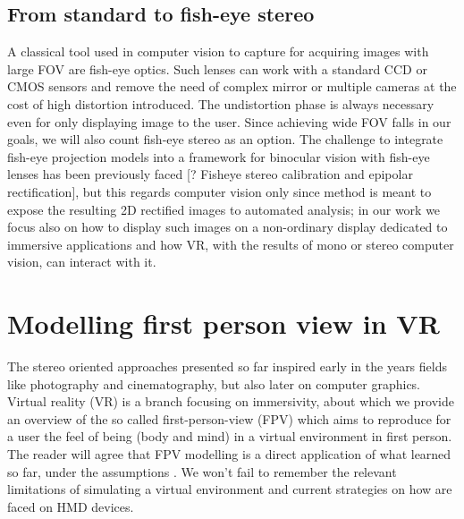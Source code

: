 \subsection{From standard to fish-eye stereo}
A classical tool used in computer vision to capture for acquiring images with large FOV are fish-eye optics. Such lenses can work with a standard CCD or CMOS sensors and remove the need of complex mirror or multiple cameras at the cost of high distortion introduced. The undistortion phase is always necessary even for only displaying image to the user. Since achieving wide FOV falls in our goals, we will also count fish-eye stereo as an option. The challenge to integrate fish-eye projection models into a framework for binocular vision with fish-eye lenses has been previously faced [? Fisheye stereo calibration and epipolar rectification], but this regards computer vision only since method is meant to expose the resulting 2D rectified images to automated analysis; in our work we focus also on how to display such images on a non-ordinary display dedicated to immersive applications and how VR, with the results of mono or stereo computer vision, can interact with it.

\section{Modelling first person view in VR}

The stereo oriented approaches presented so far inspired early in the years fields like photography and cinematography, but also later on computer graphics. Virtual reality (VR) is a branch focusing on immersivity, about which we provide an overview of the so called first-person-view (FPV) which aims to reproduce for a user the feel of being (body and mind) in a virtual environment in first person. The reader will agree that FPV modelling is a direct application of what learned so far, under the assumptions . We won't fail to remember  the relevant limitations of simulating a virtual environment and current strategies on how are faced on HMD devices.

